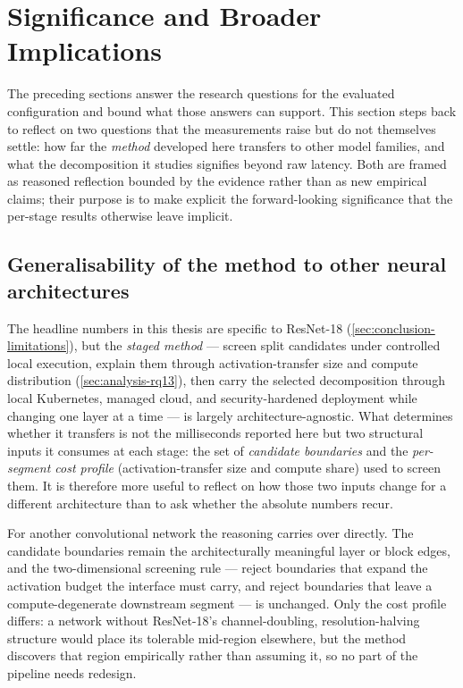 \section{Significance and Broader Implications}
\label{sec:analysis-significance}

The preceding sections answer the research questions for the evaluated
configuration and bound what those answers can support. This section steps back
to reflect on two questions that the measurements raise but do not themselves
settle: how far the \emph{method} developed here transfers to other model
families, and what the decomposition it studies signifies beyond raw latency.
Both are framed as reasoned reflection bounded by the evidence rather than as
new empirical claims; their purpose is to make explicit the forward-looking
significance that the per-stage results otherwise leave implicit.

\subsection{Generalisability of the method to other neural architectures}
\label{sec:analysis-generalisability}

The headline numbers in this thesis are specific to ResNet-18
(\cref{sec:conclusion-limitations}), but the \emph{staged method} --- screen
split candidates under controlled local execution, explain them through
activation-transfer size and compute distribution
(\cref{sec:analysis-rq13}), then carry the selected decomposition through
local Kubernetes, managed cloud, and security-hardened deployment while changing
one layer at a time --- is largely architecture-agnostic. What determines
whether it transfers is not the milliseconds reported here but two structural
inputs it consumes at each stage: the set of \emph{candidate boundaries} and the
\emph{per-segment cost profile} (activation-transfer size and compute share) used
to screen them. It is therefore more useful to reflect on how those two inputs
change for a different architecture than to ask whether the absolute numbers
recur.

For another convolutional network the reasoning carries over directly. The
candidate boundaries remain the architecturally meaningful layer or block edges,
and the two-dimensional screening rule --- reject boundaries that expand the
activation budget the interface must carry, and reject boundaries that leave a
compute-degenerate downstream segment --- is unchanged. Only the cost profile
differs: a network without ResNet-18's channel-doubling, resolution-halving
structure would place its tolerable mid-region elsewhere, but the method
discovers that region empirically rather than assuming it, so no part of the
pipeline needs redesign.

